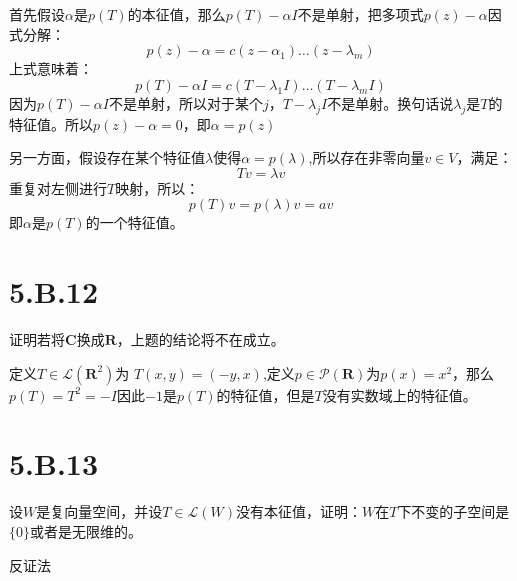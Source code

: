 \documentclass[10pt,a4paper,UTF8]{article}
\begin{document}
\begin{answer}
首先假设\(\alpha\)是\(p(T)\)的本征值，那么\(p(T) - \alpha I\)不是单射，把多项式\(p(z) - \alpha\)因式分解：
\begin{equation}
\label{eq:8}
p(z) - \alpha  = c(z-\alpha_{1})\ldots (z-\lambda_{m})
\end{equation}
上式意味着：
\begin{equation}
\label{eq:9}
p(T) - \alpha I = c(T-\lambda_{1} I) \ldots (T-\lambda_{m} I)
\end{equation}
因为\(p(T)  - \alpha I\)不是单射，所以对于某个\(j\)，\(T - \lambda_{j} I\)不是单射。换句话说\(\lambda_{j}\)是\(T\)的特征值。所以\(p(z) - \alpha  = 0\)，即\(\alpha = p(z)\)

另一方面，假设存在某个特征值\(\lambda\)使得\(\alpha = p(\lambda)\),所以存在非零向量\(v\in V\)，满足：
\begin{equation}
\label{eq:10}
Tv= \lambda v
\end{equation}
重复对左侧进行\(T\)映射，所以：
\begin{equation}
\label{eq:11}
p(T)v = p(\lambda)v = av
\end{equation}
即\(\alpha\)是\(p(T)\)的一个特征值。
\end{answer}
\section{5.B.12}
\label{sec:org75dccdf}


\begin{problem}
证明若将\(\mathbf{C}\)换成\(\mathbf{R}\)，上题的结论将不在成立。
\end{problem}

\begin{answer}
定义\(T\in \mathcal{L}(\mathbf{R}^{2})\)为 \(T(x,y) = (-y,x)\),定义\(p\in \mathcal{P}(\mathbf{R})\)为\(p(x) = x^{2}\)，那么\(p(T) = T^{2} = -I\)因此\(-1\)是\(p(T)\)的特征值，但是\(T\)没有实数域上的特征值。
\end{answer}

\section{5.B.13}
\label{sec:org2574b53}


\begin{problem}
设\(W\)是复向量空间，并设\(T\in \mathcal{L}(W)\)没有本征值，证明：\(W\)在\(T\)下不变的子空间是\(\{0\}\)或者是无限维的。
\end{problem}

\begin{answer}
反证法
\end{answer}
\end{document}
